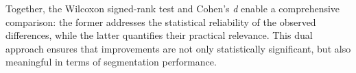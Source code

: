 Together, the Wilcoxon signed-rank test and Cohen's \textit{d} enable a comprehensive comparison: the former addresses the statistical reliability of the observed differences, while the latter quantifies their practical relevance. This dual approach ensures that improvements are not only statistically significant, but also meaningful in terms of segmentation performance.

